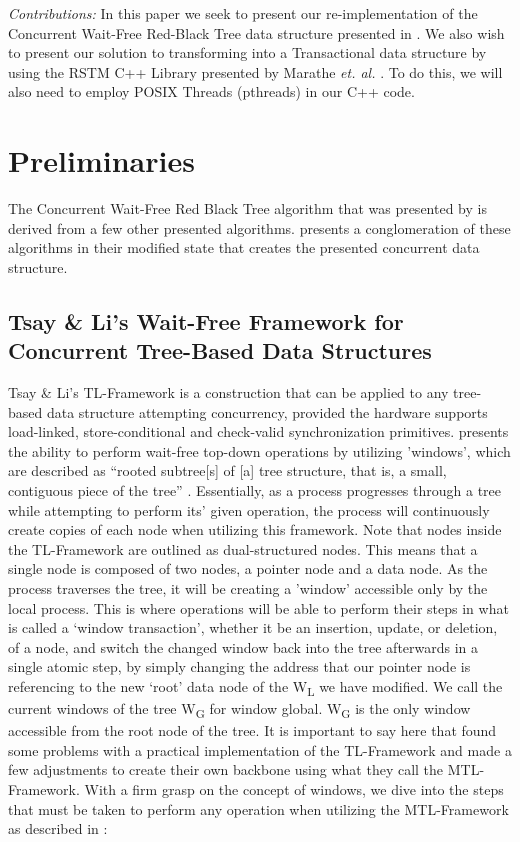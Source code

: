 \documentclass[letterpaper, 10 pt, conference]{ieeeconf}
\begin{document}
	\textit{Contributions: }In this paper we seek to present our re-implementation of the Concurrent Wait-Free Red-Black Tree data structure presented in \cite{c1}. We also wish to present our solution to transforming \cite{c1} into a Transactional data structure by using the RSTM C++ Library presented by Marathe \textit{et. al.} \cite{c6}. To do this, we will also need to employ POSIX Threads (pthreads) in our C++ code.
	\section{Preliminaries}
	
	 The Concurrent Wait-Free Red Black Tree algorithm that was presented by \cite{c1} is derived from a few other presented algorithms. \cite{c1} presents a conglomeration of these algorithms in their modified state that creates the presented concurrent data structure.
	 
	 \subsection*{Tsay \& Li's Wait-Free Framework for Concurrent Tree-Based Data Structures}
	 Tsay \& Li's \cite{c5} TL-Framework is a construction that can be applied to any tree-based data structure attempting concurrency, provided the hardware supports load-linked, store-conditional and check-valid synchronization primitives. \cite{c5} presents the ability to perform wait-free top-down operations by utilizing 'windows', which are described as ``rooted subtree[s] of [a] tree structure, that is, a small, contiguous piece of the tree'' \cite{c1}. Essentially, as a process progresses through a tree while attempting to perform its' given operation, the process will continuously create copies of each node when utilizing this framework. Note that nodes inside the TL-Framework are outlined as dual-structured nodes. This means that a single node is composed of two nodes, a pointer node and a data node. As the process traverses the tree, it will be creating a 'window' accessible only by the local process. This is where operations will be able to perform their steps in what is called a `window transaction', whether it be an insertion, update, or deletion, of a node, and switch the changed window back into the tree afterwards in a single atomic step, by simply changing the address that our pointer node is referencing to the new `root' data node of the W\textsubscript{L} we have modified. We call the current windows of the tree W\textsubscript{G} for window global. W\textsubscript{G} is the only window accessible from the root node of the tree. It is important to say here that \cite{1} found some problems with a practical implementation of the TL-Framework and made a few adjustments to create their own backbone using what they call the MTL-Framework. With a firm grasp on the concept of windows, we dive into the steps that must be taken to perform any operation when utilizing the MTL-Framework as described in \cite{c1}:
\end{document}
